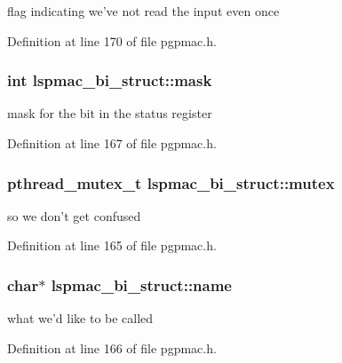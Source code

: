 flag indicating we've not read the input even once 



Definition at line 170 of file pgpmac.\-h.

\hypertarget{structlspmac__bi__struct_ac010058c9883088705059dee1d90ee72}{
\subsubsection[{mask}]{\setlength{\rightskip}{0pt plus 5cm}int lspmac\-\_\-bi\-\_\-struct\-::mask}}\label{structlspmac__bi__struct_ac010058c9883088705059dee1d90ee72}


mask for the bit in the status register 



Definition at line 167 of file pgpmac.\-h.

\hypertarget{structlspmac__bi__struct_a58053a98fa4696b56d674e775b3b4690}{
\subsubsection[{mutex}]{\setlength{\rightskip}{0pt plus 5cm}pthread\-\_\-mutex\-\_\-t lspmac\-\_\-bi\-\_\-struct\-::mutex}}\label{structlspmac__bi__struct_a58053a98fa4696b56d674e775b3b4690}


so we don't get confused 



Definition at line 165 of file pgpmac.\-h.

\hypertarget{structlspmac__bi__struct_a4e614425eaa9d1ff8ba225d264f6dcf6}{
\subsubsection[{name}]{\setlength{\rightskip}{0pt plus 5cm}char$\ast$ lspmac\-\_\-bi\-\_\-struct\-::name}}\label{structlspmac__bi__struct_a4e614425eaa9d1ff8ba225d264f6dcf6}


what we'd like to be called 



Definition at line 166 of file pgpmac.\-h.

